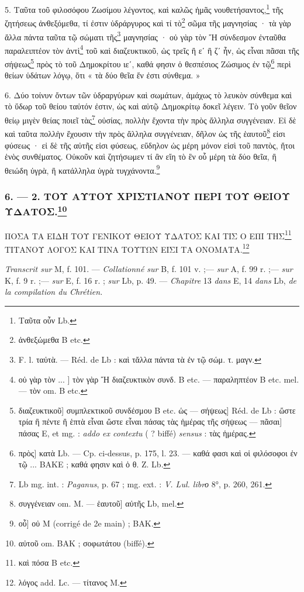 \documentclass[a4paper, 11pt, oneside, polutonikogreek, french]{article}
\begin{document}
5. Ταῦτα τοῦ φιλοσόφου Ζωσίμου λέγοντος, καὶ καλῶς ἡμᾶς νουθετήσαντος,\footnote{Ταῦτα οὖν Lb.} τῆς ζητήσεως ἀνθεξόμεθα, τί ἐστιν ὑδράργυρος καὶ τί τὸ\footnote{ἀνθεξώμεθα B etc.} σῶμα τῆς μαγνησίας · τὰ γὰρ ἄλλα πάντα ταῦτα τῷ σώματι τῆς\footnote{F. l. ταὐτὰ. --- Réd. de Lb : καὶ τἄλλα πάντα τὰ ἐν τῷ σώμ. τ. μαγν.} μαγνησίας · οὐ γὰρ τὸν Ἤ σύνδεσμον ἐνταῦθα παραλειπτέον τὸν ἀντὶ\footnote{οὐ γὰρ τὸν ... ] τὸν γὰρ Ἤ διαζευκτικὸν συνδ. B etc. --- παραληπτέον B etc. mel. --- τὸν om. B etc.} τοῦ καὶ διαζευκτικοῦ, ὡς τρεῖς ἢ εʹ ἢ ζʹ ἦν, ὡς εἶναι πᾶσαι τῆς σήψεως\footnote{διαζευκτικοῦ] συμπλεκτικοῦ συνδέσμου B etc. ὡς --- σήψεως] Réd. de Lb : ὥστε τρία ἢ πέντε ἢ ἑπτὰ εἶναι ὥστε εἶναι πάσας τὰς ἡμέρας τῆς σήψεως --- πᾶσαι] πάσας E, et mg. : \emph{addo ex contextu} ( ? biffé) \emph{sensus} : τὰς ἡμέρας.} πρὸς τὸ τοῦ Δημοκρίτου ιεʹ, καθά φησιν ὁ θεσπέσιος Ζώσιμος ἐν τῷ\footnote{πρὸς] κατὰ Lb. --- Cp. ci-dessus, p. 175, l. 23. --- καθά φασι καὶ οἱ φιλόσοφοι ἐν τῷ ... BAKE ; καθά φησιν καὶ ὁ θ. Ζ. Lb.} περὶ θείων ὑδάτων λόγῳ, ὅτι « τὰ δύο θεῖα ἕν ἐστι σύνθεμα. »

6. Δύο τοίνυν ὄντων τῶν ὑδραργύρων καὶ σωμάτων, ἀμάχως τὸ λευκὸν σύνθεμα καὶ τὸ ὕδωρ τοῦ θείου ταὐτόν ἐστιν, ὡς καὶ αὐτῷ Δημοκρίτῳ δοκεῖ λέγειν. Τὸ γοῦν θεῖον θείῳ μιγὲν θείας ποιεῖ τὰς\footnote{Lb mg. int. : \emph{Paganus}, p. 67 ; mg. ext. : \emph{V. Lul. librο} 8°, p. 260, 261.} οὐσίας, πολλὴν ἔχοντα τὴν πρὸς ἄλληλα συγγένειαν. Εἰ δὲ καὶ ταῦτα πολλὴν ἔχουσιν τὴν πρὸς ἄλληλα συγγένειαν, δῆλον ὡς τῆς ἑαυτοῦ\footnote{συγγένειαν om. M. --- ἑαυτοῦ] αὐτῆς Lb, mel.} εἰσι φύσεως · εἰ δὲ τῆς αὐτῆς εἰσι φύσεως, εὔδηλον ὡς μέρη μόνον εἰσὶ τοῦ παντὸς, ἤτοι ἑνὸς συνθέματος. Οὐκοῦν καὶ ζητήσωμεν τί ἂν εἴη τὸ ἓν οὗ μέρη τὰ δύο θεῖα, ἢ θειώδη ὑγρὰ, ἢ κατάλληλα ὑγρὰ τυγχάνοντα.\footnote{οὖ] οὐ M (corrigé de 2e main) ; BAK.}

\bigskip
\centerline{\EightStarTaper}
\centerline{\EightStarTaper\EightStarTaper}
\bigskip

\subsubsection[6. --- 2. ΤΟΥ ΑΥΤΟΥ ΧΡΙΣΤΙΑΝΟΥ ΠΕΡΙ ΤΟΥ ΘΕΙΟΥ ΥΔΑΤΟΣ.]{6. --- 2. ΤΟΥ ΑΥΤΟΥ ΧΡΙΣΤΙΑΝΟΥ ΠΕΡΙ ΤΟΥ ΘΕΙΟΥ ΥΔΑΤΟΣ.\footnote{αὐτοῦ om. BAK ; σοφωτάτου (biffé).}}

ΠΟΣΑ ΤΑ ΕΙΔΗ ΤΟΥ ΓΕΝΙΚΟΥ ΘΕΙΟΥ ΥΔΑΤΟΣ ΚΑΙ ΤΙΣ Ο ΕΠΙ ΤΗΣ\footnote{καὶ πόσα B etc.} ΤΙΤΑΝΟΥ ΛΟΓΟΣ ΚΑΙ ΤΙΝΑ ΤΟΥΤΩΝ ΕΙΣΙ ΤΑ ΟΝΟΜΑΤΑ.\footnote{λόγος add. Lc. --- τίτανος M.}

\emph{Transcrit sur} M, f. 101. --- \emph{Collationné sur} B, f. 101 v. ;--- \emph{sur} A, f. 99 r. ;--- \emph{sur} K, f. 9 r. ;--- \emph{sur} E, f. 16 r. ; \emph{sur} Lb, p. 49. --- \emph{Chapitre} 13 \emph{dans} E, 14 \emph{dans} Lb, \emph{de la compilation du Chrétien.}
\end{document}
